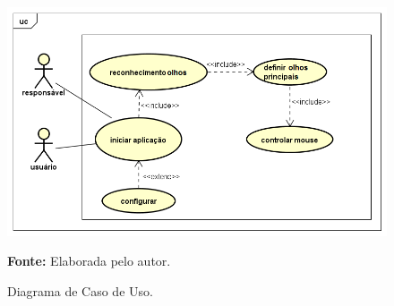 \begin{figure}[htbp]
\caption{Diagrama de Caso de Uso.}
\centering \includegraphics[scale=.6]{img/UseCase_Diagram_2.png}

\textbf{Fonte:} Elaborada pelo autor.
\label{fig:use-case-diagram}
\end{figure}





